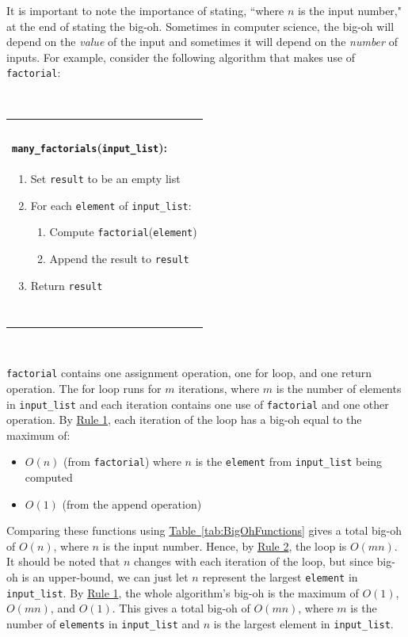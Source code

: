 \documentclass[11pt,oneside]{book}
\theoremstyle{definition}
\begin{document}
It is important to note the importance of stating, ``where $n$ is the input number," at the end of stating the big-oh.
Sometimes in computer science, the big-oh will depend on the \emph{value} of the input and sometimes it will depend on the \emph{number} of inputs.
For example, consider the following algorithm that makes use of \texttt{factorial}:

\

\begin{tabular}{|p{\textwidth}|}
\hline
\ \\
\textbf{\huge \texttt{many\_factorials}(\texttt{input\_list}):} \\
\begin{enumerate}[topsep=0pt]
    \item Set \texttt{result} to be an empty list

    \item For each \texttt{element} of \texttt{input\_list}:
    \begin{enumerate}
        \item Compute \texttt{factorial}(\texttt{element})

        \item Append the result to \texttt{result}
    \end{enumerate}

    \item Return \texttt{result}
\end{enumerate} \\
\ \\
\hline
\end{tabular}

\

\texttt{factorial} contains one assignment operation, one for loop, and one return operation.
The for loop runs for $m$ iterations, where $m$ is the number of elements in \texttt{input\_list} and each iteration contains one use of \texttt{factorial} and one other operation.
By \hyperref[quote:Rule1]{Rule 1}, each iteration of the loop has a big-oh equal to the maximum of:
\begin{itemize}
    \item $O(n)$ (from \texttt{factorial}) where $n$ is the \texttt{element} from \texttt{input\_list} being computed

    \item $O(1)$ (from the append operation)
\end{itemize}
Comparing these functions using \hyperref[tab:BigOhFunctions]{Table~\ref*{tab:BigOhFunctions}} gives a total big-oh of $O(n)$, where $n$ is the input number.
Hence, by \hyperref[quote:Rule2]{Rule 2}, the loop is $O(mn)$.
It should be noted that $n$ changes with each iteration of the loop, but since big-oh is an upper-bound, we can just let $n$ represent the largest \texttt{element} in \texttt{input\_list}.
By \hyperref[quote:Rule1]{Rule 1}, the whole algorithm's big-oh is the maximum of $O(1)$, $O(mn)$, and $O(1)$.
This gives a total big-oh of $O(mn)$, where $m$ is the number of \texttt{elements} in \texttt{input\_list} and $n$ is the largest element in \texttt{input\_list}.
\end{document}
